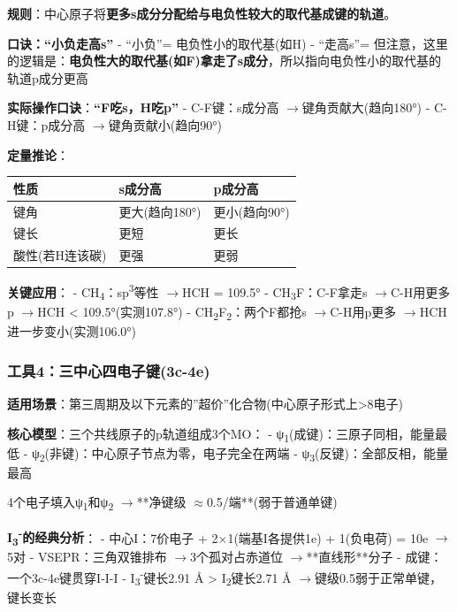 \documentclass[a4paper,11pt]{ctexart}
\newcounter{none}
\newcommand{\箭}{\ensuremath{\rightarrow}}
\newcommand{\左箭}{\ensuremath{\leftarrow}}
\newcommand{\上箭}{\ensuremath{\uparrow}}
\newcommand{\下箭}{\ensuremath{\downarrow}}
\newcommand{\衡}{\ensuremath{\rightleftharpoons}}
\newcommand{\双箭}{\ensuremath{\leftrightarrow}}
\newcommand{\约等于}{\ensuremath{\approx}}
\newcommand{\小于等于}{\ensuremath{\leq}}
\newcommand{\大于等于}{\ensuremath{\geq}}
\newcommand{\不等于}{\ensuremath{\neq}}
\newcommand{\西格马}{\ensuremath{\sigma}}
\newcommand{\派}{\ensuremath{\pi}}
\begin{document}
\textbf{规则}：中心原子将\textbf{更多s成分分配给与电负性较大的取代基成键的轨道}。

\textbf{口诀：``小负走高s''}
- ``小负''= 电负性小的取代基(如H)
- ``走高s''= 但注意，这里的逻辑是：\textbf{电负性大的取代基(如F)拿走了s成分}，所以指向电负性小的取代基的轨道p成分更高

\textbf{实际操作口诀}：\textbf{``F吃s，H吃p''}
- C-F键：s成分高 \箭 键角贡献大(趋向180°)
- C-H键：p成分高 \箭 键角贡献小(趋向90°)

\textbf{定量推论}：

{\def\LTcaptype{none} %
\begin{longtable}[]{@{}lll@{}}
\toprule\noalign{}
性质 & s成分高 & p成分高 \\
\midrule\noalign{}
\endhead
\bottomrule\noalign{}
\endlastfoot
键角 & 更大(趋向180°) & 更小(趋向90°) \\
键长 & 更短 & 更长 \\
酸性(若H连该碳) & 更强 & 更弱 \\
\end{longtable}
}

\textbf{关键应用}：
- CH\textsubscript{4}：sp\textsuperscript{3}等性 \箭 HCH = 109.5°
- CH\textsubscript{3}F：C-F拿走s \箭 C-H用更多p \箭 HCH \textless{} 109.5°(实测107.8°)
- CH\textsubscript{2}F\textsubscript{2}：两个F都抢s \箭 C-H用p更多 \箭 HCH进一步变小(实测106.0°)

\subsubsection{工具4：三中心四电子键(3c-4e)}\label{ux5de5ux51774ux4e09ux4e2dux5fc3ux56dbux7535ux5b50ux952e3c-4e}

\textbf{适用场景}：第三周期及以下元素的''超价''化合物(中心原子形式上\textgreater8电子)

\textbf{核心模型}：三个共线原子的p轨道组成3个MO：
- ψ\textsubscript{1}(成键)：三原子同相，能量最低
- ψ\textsubscript{2}(非键)：中心原子节点为零，电子完全在两端
- ψ\textsubscript{3}(反键)：全部反相，能量最高

4个电子填入ψ\textsubscript{1}和ψ\textsubscript{2} \箭 **净键级 \约等于 0.5/端**(弱于普通单键)

\textbf{I\textsubscript{3}\textsuperscript{-}的经典分析}：
- 中心I：7价电子 + 2×1(端基I各提供1e) + 1(负电荷) = 10e \箭 5对
- VSEPR：三角双锥排布 \箭 3个孤对占赤道位 \箭 **直线形**分子
- 成键：一个3c-4e键贯穿I-I-I
- I\textsubscript{3}\textsuperscript{-}键长2.91 Å \textgreater{} I\textsubscript{2}键长2.71 Å \箭 键级0.5弱于正常单键，键长变长
\end{document}
